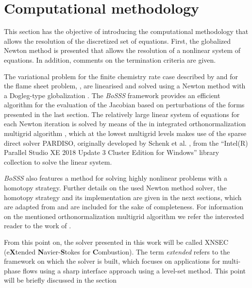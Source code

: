 \chapter{Computational methodology} \label{sec:CompMethodology}
This section has the objective of introducing the computational methodology that allows the resolution of the discretized set of equations. First, the globalized Newton method is presented that allows the resolution of a nonlinear system of equations. In addition, comments on the termination criteria are given.



The variational problem for the finite chemistry rate case described by  and for the flame sheet problem, , are linearised and solved using a Newton method with a Dogleg-type globalization \textcite{pawlowskiGlobalizationTechniquesNewton2006,pawlowskiInexactNewtonDogleg2008}. The \textit{BoSSS} framework provides an efficient algorithm for the evaluation of the Jacobian based on perturbations of the forms presented in the last section.
The relatively large linear system of equations for each Newton iteration is solved by means of the in \BoSSS integrated orthonormalization multigrid algorithm \textcite{kummerBoSSSPackageMultigrid2021}, which at the lowest multigrid levels makes use of the sparse direct solver PARDISO, originally developed by Schenk et al. \textcite{schenkEfficientSparseLU2000,schenkTwolevelDynamicScheduling2002,schenkSolvingUnsymmetricSparse2004a},
from the ``Intel(R) Parallel Studio XE 2018 Update 3 Cluster Edition for Windows'' library collection to solve the linear system.

\textit{BoSSS} also features a method for solving highly nonlinear problems with a homotopy strategy.
Further details on the used Newton method solver, the homotopy strategy and its implementation are given in the next sections, which are adapted from \textcite{kikkerFullyCoupledHighorder}  and are included for the sake of completeness. For information on the mentioned orthonormalization multigrid algorithm we refer the interested reader to the work of \textcite{kummerBoSSSPackageMultigrid2021}.

From this point on, the solver presented in this work will be called XNSEC (e\textbf{X}tended \textbf{N}avier-\textbf{S}tokes for \textbf{C}ombustion). The term \textit{extended} refers to the framework on which the solver is built, which focuses on applications for multi-phase flows using a sharp interface approach using a level-set method. This point will be briefly discussed in the section %
